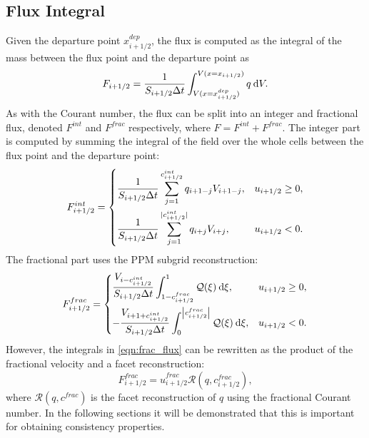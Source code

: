 \documentclass[11pt,a4paper]{article}
\newcommand{\dx}[1]{\hspace{0.75mm}\mathrm{d}{#1}}
\begin{document}
\subsection{Flux Integral}

Given the departure point $x^{dep}_{i+1/2}$, the flux is computed as the integral of the mass between the flux point and the departure point as
\begin{equation}
F_{i+1/2} = 
\frac{1}{S_{i+1/2}\Delta{t}} \int^{V(x=x_{i+1/2})}_{V(x=x^{dep}_{i+1/2})} q \dx{V}.  
\end{equation}
As with the Courant number, the flux can be split into an integer and fractional flux, denoted $F^{int}$ and $F^{frac}$ respectively, where $F = F^{int} + F^{frac}$.
The integer part is computed by summing the integral of the field over the whole cells between the flux point and the departure point:
\begin{equation}
    F^{int}_{i+1/2} = 
    \begin{dcases}
        \frac{1}{S_{i+1/2}\Delta{t}}\sum_{j=1}^{c_{i+1/2}^{int}} q_{i+1-j} V_{i+1-j}, & u_{i+1/2} \geq 0, \\
        \frac{1}{S_{i+1/2}\Delta{t}}\sum_{j=1}^{|c_{i+1/2}^{int}|} q_{i+j} V_{i+j}, & u_{i+1/2} < 0.
    \end{dcases}
\end{equation}
The fractional part uses the PPM subgrid reconstruction:
\begin{equation} \label{eqn:frac_flux}
    F^{frac}_{i+1/2} = 
    \begin{dcases}
        \frac{V_{i-c^{int}_{i+1/2}}}{S_{i+1/2}\Delta t} \int^{1}_{1-c_{i+1/2}^{frac}} \mathcal{Q}(\xi) \dx{\xi}, & u_{i+1/2} \ge 0, \\
        -\frac{V_{i+1+c^{int}_{i+1/2}}}{S_{i+1/2}\Delta t} \int^{\left| c_{i+1/2}^{frac}\right|}_{0} \mathcal{Q}(\xi) \dx{\xi}, & u_{i+1/2} < 0.  
    \end{dcases}
\end{equation}
However, the integrals in \eqref{eqn:frac_flux} can be rewritten as the product of the fractional velocity and a facet reconstruction:
\begin{equation} \label{eqn:consistent_flux}
F_{i+1/2}^{frac} = \widehat{u}_{i+1/2}^{frac} \mathcal{R}(q,c_{i+1/2}^{frac}),
\end{equation}
where $\mathcal{R}(q,c^{frac})$ is the facet reconstruction of $q$ using the fractional Courant number.
In the following sections it will be demonstrated that this is important for obtaining consistency properties.
\end{document}
